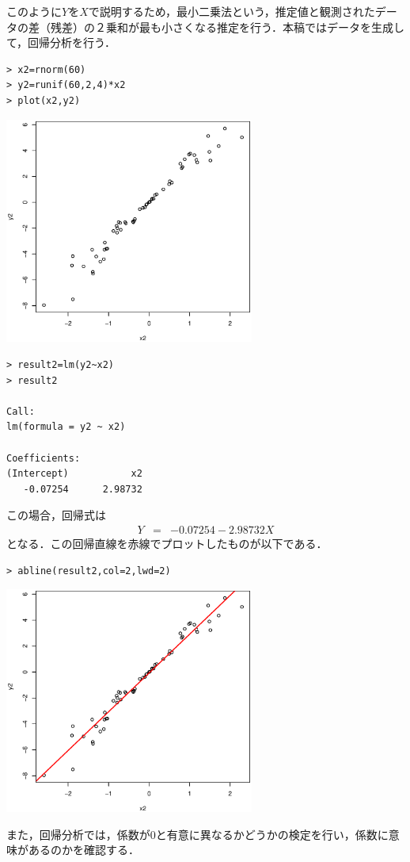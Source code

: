 \documentclass[a4paper,10pt,fleqn]{jarticle}
\begin{document}
このように$Y$を$X$で説明するため，最小二乗法という，推定値と観測されたデータの差（残差）の２乗和が最も小さくなる推定を行う．本稿ではデータを生成して，回帰分析を行う．
\begin{breakbox}
\begin{verbatim}
> x2=rnorm(60)
> y2=runif(60,2,4)*x2
> plot(x2,y2)
\end{verbatim}
\begin{center}
\includegraphics[width=8.2cm]{img/plot2.eps}
\end{center}
\begin{verbatim}
> result2=lm(y2~x2)
> result2

Call:
lm(formula = y2 ~ x2)

Coefficients:
(Intercept)           x2  
   -0.07254      2.98732  
\end{verbatim}
\end{breakbox}
この場合，回帰式は
\begin{eqnarray*}
Y&=&-0.07254-2.98732X
\end{eqnarray*}
となる．この回帰直線を赤線でプロットしたものが以下である．
\begin{breakbox}
\begin{verbatim}
> abline(result2,col=2,lwd=2)
\end{verbatim}
\begin{center}
\includegraphics[width=8.2cm]{img/abline2.eps}
\end{center}
\end{breakbox}
また，回帰分析では，係数が$0$と有意に異なるかどうかの検定を行い，係数に意味があるのかを確認する．
\end{document}
